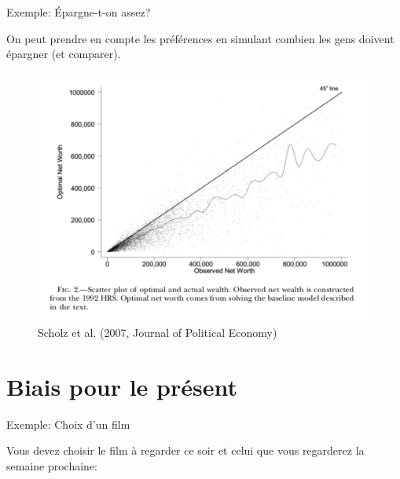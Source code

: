\documentclass[handout]{beamer}
\begin{document}
\begin{frame}{Exemple: Épargne-t-on assez?}

On peut prendre en compte les préférences en simulant combien les gens doivent épargner (et comparer).

\begin{figure}
	\includegraphics[scale=0.4]{savings.png}
	\caption{Scholz et al. (2007, Journal of Political Economy)}
\end{figure}


\end{frame}

\section{Biais pour le présent}

\begin{frame}{Exemple: Choix d'un film}

Vous devez choisir le film à regarder ce soir et celui que vous regarderez la semaine prochaine: 

\begin{figure}

\end{figure}

\end{frame}
\end{document}
